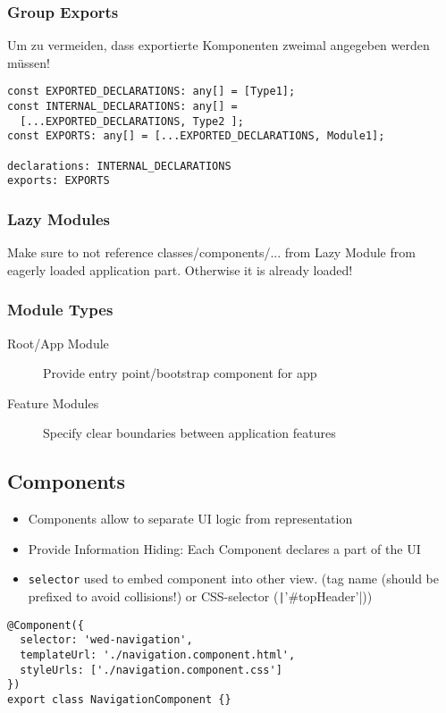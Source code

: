 \begin{multicols*}{2}
\subsubsection{Group Exports}
Um zu vermeiden, dass exportierte Komponenten zweimal angegeben werden müssen!
\begin{verbatim}
const EXPORTED_DECLARATIONS: any[] = [Type1];
const INTERNAL_DECLARATIONS: any[] =
  [...EXPORTED_DECLARATIONS, Type2 ];
const EXPORTS: any[] = [...EXPORTED_DECLARATIONS, Module1];

declarations: INTERNAL_DECLARATIONS
exports: EXPORTS
\end{verbatim}

\subsubsection{Lazy Modules}
Make sure to not reference classes/components/... from Lazy Module from eagerly loaded application part. Otherwise it is already loaded!

\subsubsection{Module Types}
\begin{description}
    \item[Root/App Module] Provide entry point/bootstrap component for app
    \item[Feature Modules] Specify clear boundaries between application features

\end{description}

\subsection{Components}
\begin{itemize}
    \item Components allow to separate UI logic from representation
    \item Provide Information Hiding: Each Component declares a part of the UI
    \item \lstinline|selector| used to embed component into other view. (tag name (should be prefixed to avoid collisions!) or CSS-selector (\texttt|'#topHeader'|))
\end{itemize}

\begin{verbatim}
@Component({
  selector: 'wed-navigation',
  templateUrl: './navigation.component.html',
  styleUrls: ['./navigation.component.css']
})
export class NavigationComponent {}
\end{verbatim}


\end{multicols*}
